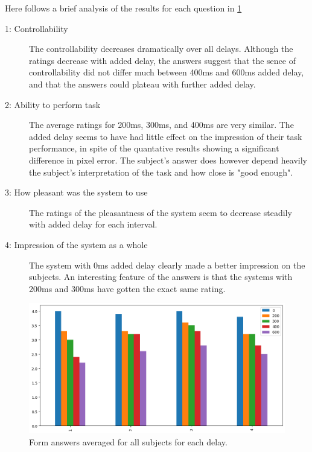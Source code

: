 \documentclass[nofilelist]{cslthse-msc}
\begin{document}
Here follows a brief analysis of the results for each question in \ref{fig:form-ans}
\begin{description}
   \item[1: Controllability] 
   The controllability decreases dramatically over all delays. Although the ratings decrease with added delay, the answers suggest that the sence of controllability did not differ much between 400ms and 600ms added delay, and that the answers could plateau with further added delay.  

   \item[2: Ability to perform task] 
   The average ratings for 200ms, 300ms, and 400ms are very similar. The added delay seems to have had little effect on the impression of their task performance, in spite of the quantative results showing a significant difference in pixel error. The subject's answer does however depend heavily the subject's interpretation of the task and how close is "good enough".
 
   \item[3: How pleasant was the system to use]
   The ratings of the pleasantness of the system seem to decrease steadily with added delay for each interval.

   \item[4: Impression of the system as a whole] 
   The system with 0ms added delay clearly made a better impression on the subjects. An interesting feature of the answers is that the systems with 200ms and 300ms have gotten the exact same rating.

\end{description}

\begin{figure}[!hbt]
   \centering
   \includegraphics[scale=0.6]{images/form-ans.png} 
   \caption{Form answers averaged for all subjects for each delay.}
   \label{fig:form-ans}
\end{figure}
\end{document}
